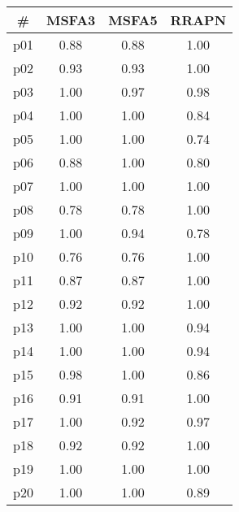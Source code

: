 \begin{tabular}{c||c|c|c}
\textbf{\#} & \textbf{MSFA3} & \textbf{MSFA5} & \textbf{RRAPN}\\
\hline
\hline
p01 & 0.88 & 0.88 & 1.00\\
p02 & 0.93 & 0.93 & 1.00\\
p03 & 1.00 & 0.97 & 0.98\\
p04 & 1.00 & 1.00 & 0.84\\
p05 & 1.00 & 1.00 & 0.74\\
p06 & 0.88 & 1.00 & 0.80\\
p07 & 1.00 & 1.00 & 1.00\\
p08 & 0.78 & 0.78 & 1.00\\
p09 & 1.00 & 0.94 & 0.78\\
p10 & 0.76 & 0.76 & 1.00\\
p11 & 0.87 & 0.87 & 1.00\\
p12 & 0.92 & 0.92 & 1.00\\
p13 & 1.00 & 1.00 & 0.94\\
p14 & 1.00 & 1.00 & 0.94\\
p15 & 0.98 & 1.00 & 0.86\\
p16 & 0.91 & 0.91 & 1.00\\
p17 & 1.00 & 0.92 & 0.97\\
p18 & 0.92 & 0.92 & 1.00\\
p19 & 1.00 & 1.00 & 1.00\\
p20 & 1.00 & 1.00 & 0.89\\
\end{tabular}

